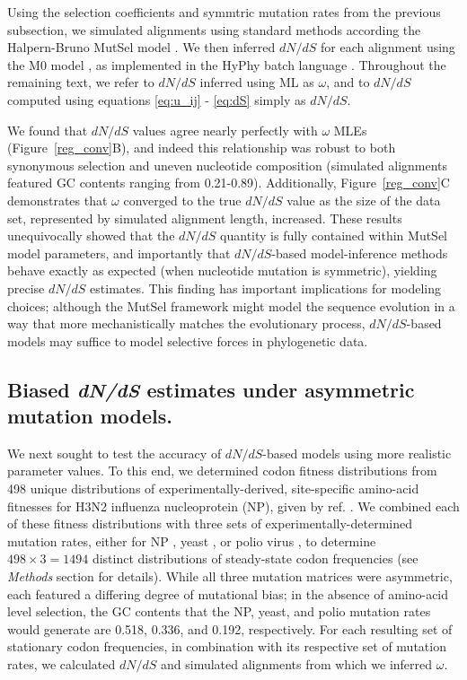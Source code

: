 \documentclass[11pt]{article}
\begin{document}
Using the selection coefficients and symmtric mutation rates from the previous subsection, we simulated alignments using standard methods \cite{Yang2006} according the Halpern-Bruno MutSel model \cite{HalpernBruno1998}. We then inferred $dN/dS$ for each alignment using the M0 model \cite{GoldmanYang1994,Yangetal2000}, as implemented in the HyPhy batch language \cite{KosakovskyPondetal2005}. Throughout the remaining text, we refer to $dN/dS$ inferred using ML as $\omega$, and to $dN/dS$ computed using equations \eqref{eq:u_ij} - \eqref{eq:dS} simply as $dN/dS$. 

We found that $dN/dS$ values agree nearly perfectly with $\omega$ MLEs (Figure~\ref{reg_conv}B), and indeed this relationship was robust to both synonymous selection and uneven nucleotide composition (simulated alignments featured GC contents ranging from 0.21-0.89). Additionally, Figure~\ref{reg_conv}C demonstrates that $\omega$ converged to the true $dN/dS$ value as the size of the data set, represented by simulated alignment length, increased. These results unequivocally showed that the $dN/dS$ quantity is fully contained within MutSel model parameters, and importantly that $dN/dS$-based model-inference methods behave exactly as expected (when nucleotide mutation is symmetric), yielding precise $dN/dS$ estimates. This finding has important implications for modeling choices; although the MutSel framework might model the sequence evolution in a way that more mechanistically matches the evolutionary process, $dN/dS$-based models may suffice to model selective forces in phylogenetic data.


\subsection*{Biased \emph{dN/dS} estimates under asymmetric mutation models.}
We next sought to test the accuracy of $dN/dS$-based models using more realistic parameter values. To this end, we determined codon fitness distributions from 498 unique distributions of experimentally-derived, site-specific amino-acid fitnesses for H3N2 influenza nucleoprotein (NP), given by ref. \cite{Bloom2014a}. We combined each of these fitness distributions with three sets of experimentally-determined mutation rates, either for NP \cite{Bloom2014a}, yeast \cite{Zhu2014}, or polio virus \cite{Acevedo2014}, to determine $498 \times 3 = 1494$ distinct distributions of steady-state codon frequencies (see \emph{Methods} section for details). While all three mutation matrices were asymmetric, each featured a differing degree of mutational bias; in the absence of amino-acid level selection, the GC contents that the NP, yeast, and polio mutation rates would generate are 0.518, 0.336, and 0.192, respectively. For each resulting set of stationary codon frequencies, in combination with its respective set of mutation rates, we calculated $dN/dS$ and simulated alignments from which we inferred $\omega$.
\end{document}
